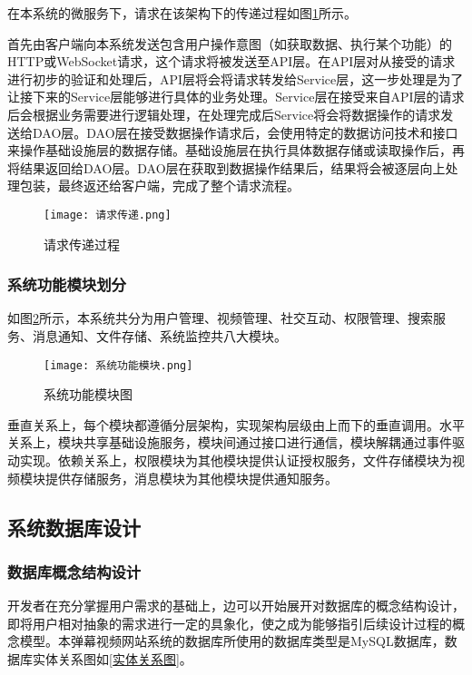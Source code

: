 在本系统的微服务下，请求在该架构下的传递过程如图\ref{请求传递过程}所示。

首先由客户端向本系统发送包含用户操作意图（如获取数据、执行某个功能）的HTTP或WebSocket请求，这个请求将被发送至API层。在API层对从接受的请求进行初步的验证和处理后，API层将会将请求转发给Service层，这一步处理是为了让接下来的Service层能够进行具体的业务处理。Service层在接受来自API层的请求后会根据业务需要进行逻辑处理，在处理完成后Service将会将数据操作的请求发送给DAO层。DAO层在接受数据操作请求后，会使用特定的数据访问技术和接口来操作基础设施层的数据存储。基础设施层在执行具体数据存储或读取操作后，再将结果返回给DAO层。DAO层在获取到数据操作结果后，结果将会被逐层向上处理包装，最终返还给客户端，完成了整个请求流程。
\begin{figure}[hbt]
    \centering
    \texttt{[image: 请求传递.png]}
    \caption{请求传递过程}
    \label{请求传递过程}
\end{figure}

\subsubsection{系统功能模块划分}

如图\ref{系统功能模块图}所示，本系统共分为用户管理、视频管理、社交互动、权限管理、搜索服务、消息通知、文件存储、系统监控共八大模块。
\begin{figure}[hbt]
    \centering
    \texttt{[image: 系统功能模块.png]}
    \caption{系统功能模块图}
    \label{系统功能模块图}
\end{figure}

垂直关系上，每个模块都遵循分层架构，实现架构层级由上而下的垂直调用。水平关系上，模块共享基础设施服务，模块间通过接口进行通信，模块解耦通过事件驱动实现。依赖关系上，权限模块为其他模块提供认证授权服务，文件存储模块为视频模块提供存储服务，消息模块为其他模块提供通知服务。

\subsection{系统数据库设计}

\subsubsection{数据库概念结构设计}

开发者在充分掌握用户需求的基础上，边可以开始展开对数据库的概念结构设计，即将用户相对抽象的需求进行一定的具象化，使之成为能够指引后续设计过程的概念模型\cite{RN09}。本弹幕视频网站系统的数据库所使用的数据库类型是MySQL数据库，数据库实体关系图如\ref{实体关系图}。

